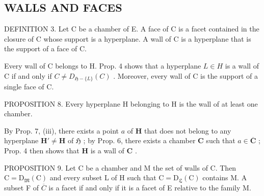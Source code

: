 \subsection{WALLS AND FACES}

DEFINITION 3. Let C be a chamber of E. A face of C is a facet contained in the closure of C whose support is a hyperplane. A wall of C is a hyperplane that is the support of a face of C.

Every wall of C belongs to H. Prop. 4 shows that a hyperplane \(L \in H\) is a wall of C if and only if \(C \neq D_{\mathfrak{H} - \{L\}}(C)\) . Moreover, every wall of C is the support of a single face of C.

PROPOSITION 8. Every hyperplane H belonging to H is the wall of at least one chamber.

By Prop. 7, (iii), there exists a point \(a\) of \(\mathbf{H}\) that does not belong to any hyperplane \(\mathbf{H}' \neq \mathbf{H}\) of \(\mathfrak{H}\) ; by Prop. 6, there exists a chamber \(\mathbf{C}\) such that \(a \in \overline{\mathbf{C}}\) ; Prop. 4 then shows that \(\mathbf{H}\) is a wall of \(\mathbf{C}\) .

PROPOSITION 9. Let C be a chamber and M the set of walls of C. Then \(\mathrm{C} = \mathrm{D}_{\mathfrak{M}}(\mathrm{C})\) and every subset L of H such that \(\mathrm{C} = \mathrm{D}_{\mathfrak{L}}(\mathrm{C})\) contains M. A subset F of \(\overline{C}\) is a facet if and only if it is a facet of E relative to the family M.

